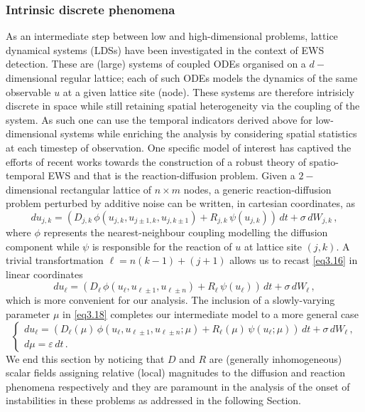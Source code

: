 \documentclass[../main.tex]{subfiles}
\begin{document}
\subsubsection{Intrinsic discrete phenomena}\label{subsubsec3.2.1}
As an intermediate step between low and high-dimensional problems, lattice dynamical systems (LDSs) have been investigated in the context of EWS detection. These are (large) systems of coupled ODEs organised on a $d-$dimensional regular lattice; each of such ODEs models the dynamics of the same observable $u$ at a given lattice site (node).
These systems are therefore intrisicly discrete in space while still retaining spatial heterogeneity via the coupling of the system.
As such one can use the temporal indicators derived above for low-dimensional systems while enriching the analysis by considering spatial statistics at each timestep of observation.
One specific model of interest has captived the efforts of recent works towards the construction of a robust theory of spatio-temporal EWS and that is the reaction-diffusion problem.
Given a $2-$dimensional rectangular lattice of $n\times m$ nodes, a generic reaction-diffusion problem perturbed by additive noise can be written, in cartesian coordinates, as
\begin{equation}\label{eq3.17}
     du_{j,k} = (D_{j,k}\,\phi(u_{j,k}, u_{j\pm1,k}, u_{j,k\pm1}) + R_{j,k}\,\psi(u_{j,k}))\,dt + \sigma\,dW_{j,k}\,,
\end{equation}
where $\phi$ represents the nearest-neighbour coupling modelling the diffusion component while $\psi$ is responsible for the reaction of $u$ at lattice site $(j,k)$.
A trivial transfortmation $\ell=n(k-1)+(j+1)$ allows us to recast \eqref{eq3.16} in linear coordinates
\begin{equation}\label{eq3.18}
     du_{\ell} = (D_{\ell}\,\phi(u_{\ell}, u_{\ell\pm1}, u_{\ell\pm n}) + R_{\ell}\,\psi(u_{\ell}))\,dt + \sigma\,dW_{\ell}\,,
\end{equation}
which is more convenient for our analysis.
The inclusion of a slowly-varying parameter $\mu$ in \eqref{eq3.18} completes our intermediate model to a more general case
\begin{equation}\label{eq3.19}
   \begin{cases}
      du_{\ell} = (D_{\ell}(\mu)\,\phi(u_{\ell}, u_{\ell\pm1}, u_{\ell\pm n}; \mu) + R_{\ell}(\mu)\,\psi(u_{\ell}; \mu))\,dt + \sigma\,dW_{\ell} \,, \\
      d\mu = \varepsilon\,dt \,. 
   \end{cases}
\end{equation}
We end this section by noticing that $D$ and $R$ are (generally inhomogeneous) scalar fields assigning relative (local) magnitudes to the diffusion and reaction phenomena respectively and they are paramount in the analysis of the onset of instabilities in these problems as addressed in the following Section.
\end{document}
